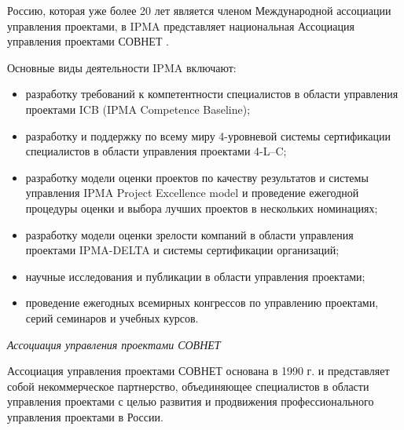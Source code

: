 Россию, которая уже более 20 лет является членом Международной ассоциации управления проектами, в IPMA представляет национальная Ассоциация управления проектами СОВНЕТ  \cite[34]{aleshin}.

Основные виды деятельности IPMA включают:
\begin{itemize}
	\item разработку требований к компетентности специалистов в области управления проектами ICB (IPMA Competence Baseline);
	\item разработку и поддержку по всему миру 4-уровневой системы сертификации специалистов в области управления проектами 4-L–C;
	\item разработку модели оценки проектов по качеству результатов и системы управления IPMA Project Excellence model и проведение ежегодной процедуры оценки и выбора лучших проектов в нескольких номинациях;
	\item разработку модели оценки зрелости компаний в области управления проектами IPMA-DELTA и системы сертификации организаций;
	\item научные исследования и публикации в области управления проектами;
	\item проведение ежегодных всемирных конгрессов по управлению проектами, серий семинаров и учебных курсов.
\end{itemize}

\textit{Ассоциация управления проектами СОВНЕТ}

Ассоциация управления проектами СОВНЕТ основана в 1990 г. и представляет собой некоммерческое партнерство, объединяющее специалистов в области управления проектами с целью развития и продвижения профессионального управления проектами в России.


